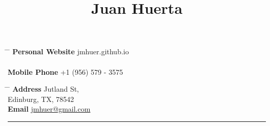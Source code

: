 \documentclass[10pt]{article} %
\begin{document}
\pagestyle{fancy}

\title{Juan Huerta } %


\parbox{0.5\textwidth}{ %
\begin{tabbing} %
\hspace{3cm} \= \hspace{4cm} \= \kill %
{\bf Personal Website} \>  jmhuer.github.io \\ %
\\
{\bf Mobile Phone} \> +1 (956) 579 - 3575 \\ %

\end{tabbing}}
\hfill %
\parbox{0.5\textwidth}{ %
\begin{tabbing} %
\hspace{3cm} \= \hspace{4cm} \= \kill %
{\bf Address}  Jutland St,\\ %
\> Edinburg, TX, 78542 \\ %
{\bf Email} \> \href{mailto:jmhuer@gmail.com}{jmhuer@gmail.com} \\ %
\end{tabbing}}



\noindent\rule{1cm}{0.4pt}
\end{document}
